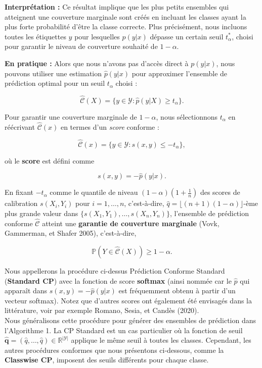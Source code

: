 \documentclass[12pt,a4paper]{article}
\begin{document}
\textbf{Interprétation :} Ce résultat implique que les plus petits ensembles qui atteignent une couverture marginale sont créés en incluant les classes ayant la plus forte probabilité d'être la classe correcte. Plus précisément, nous incluons toutes les étiquettes \( y \) pour lesquelles \( p(y|x) \) dépasse un certain seuil \( t^*_{\alpha} \), choisi pour garantir le niveau de couverture souhaité de \( 1 - \alpha \).

\textbf{En pratique :}
Alors que nous n'avons pas d'accès direct à \( p(y|x) \), nous pouvons utiliser une estimation \( \hat{p}(y|x) \) pour approximer l'ensemble de prédiction optimal pour un seuil \( t_{\alpha} \) choisi :

\[
\hat{\mathcal{C}}(X) = \{ y \in \mathcal{Y} : \hat{p}(y|X) \geq t_{\alpha} \}.
\]

Pour garantir une couverture marginale de \( 1 - \alpha \), nous sélectionnons \( t_{\alpha} \) en réécrivant \( \hat{\mathcal{C}}(x) \) en termes d'un \textit{score} conforme :

\[
\hat{\mathcal{C}}(x) = \{ y \in \mathcal{Y} : s(x, y) \leq -t_{\alpha} \},
\]

où le \textbf{score} est défini comme

\[
s(x, y) = -\hat{p}(y|x).
\]

En fixant \( -t_{\alpha} \) comme le quantile de niveau \( (1 - \alpha)(1 + \frac{1}{n}) \) des scores de calibration \( s(X_i, Y_i) \) pour \( i = 1, \ldots, n \), c'est-à-dire, \( \hat{q} = \lfloor (n + 1)(1 - \alpha) \rfloor \)-ème plus grande valeur dans \( \{ s(X_1, Y_1), \ldots, s(X_n, Y_n) \} \), l'ensemble de prédiction conforme \( \hat{\mathcal{C}} \) atteint une \textbf{garantie de couverture marginale} (Vovk, Gammerman, et Shafer 2005), c'est-à-dire,

\[
\mathbb{P}(Y \in \hat{\mathcal{C}}(X)) \geq 1 - \alpha.
\]


\noindent Nous appellerons la procédure ci-dessus Prédiction Conforme Standard (\textbf{Standard CP}) avec la fonction de score \textbf{softmax} (ainsi nommée car le $\hat{p}$ qui apparaît dans $s(x,y) = -\hat{p}(y|x)$ est fréquemment obtenu à partir d'un vecteur softmax). Notez que d'autres scores ont également été envisagés dans la littérature, voir par exemple Romano, Sesia, et Candès ({\color{linkorange}2020}).\\

\noindent Nous généralisons cette procédure pour générer des ensembles de prédiction dans l'{\color{linkorange}Algorithme 1}. La CP Standard est un cas particulier où la fonction de seuil $\hat{\mathbf{q}} = (\hat{q}, \dots, \hat{q}) \in \mathbb{R}^{|\mathcal{Y}|}$ applique le même seuil à toutes les classes. Cependant, les autres procédures conformes que nous présentons ci-dessous, comme la \textbf{Classwise CP}, imposent des seuils différents pour chaque classe.\\
\end{document}
